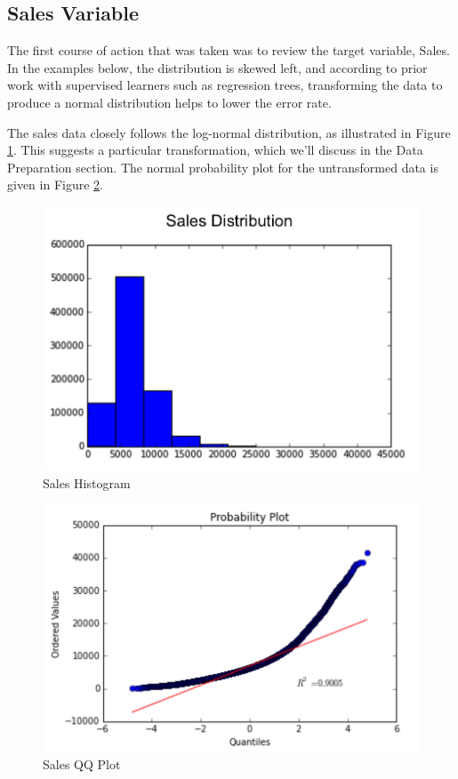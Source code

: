 \documentclass[DIV=calc, paper=a4, fontsize=11pt]{scrartcl}	 %
\begin{document}
\subsection*{Sales Variable}

The first course of action that was taken was to review the target variable, Sales. In the examples below, the distribution is skewed left, and according to prior work with supervised learners such as regression trees, transforming the data to produce a normal distribution helps to lower the error rate\cite{Jank}. 

The sales data closely follows the log-normal distribution, as illustrated in Figure \ref{lognormalhist}. This suggests a particular transformation, which we'll discuss in the Data Preparation section. The normal probability plot for the untransformed data is given in Figure \ref{lognormalqq}.

\begin{figure}[!htbp]
\centering
\caption{Sales Histogram}
\label{lognormalhist}
\includegraphics[scale=0.75]{figures/saleslognormalhist.png}
\end{figure} 

\begin{figure}[!htbp]
\centering
\caption{Sales QQ Plot}
\label{lognormalqq}
\includegraphics[scale=0.75]{figures/saleslognormalQQ.png}
\end{figure} 
\end{document}
